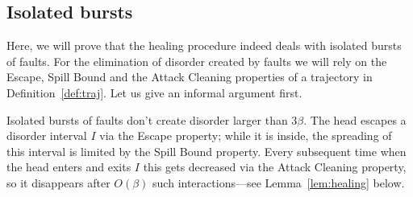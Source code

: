 \documentclass[11pt]{memoir}
\theoremstyle{definition} %
\def\B{B}
\newcommand{\Tu}{T}
\newcommand{\Z}{Z} %
\newcommand{\cns}[1]{c_{\textrm{\upshape #1}}}
\newcommand{\CEsc}{\cns{esc}}
\newcommand{\CMarg}{\cns{marg}}
\newcommand{\CSpill}{\cns{spill}}
\begin{document}

\subsection{Isolated bursts}\label{sec:1-level-noise}

Here, we will prove that the healing procedure indeed deals with isolated bursts of faults.
For the elimination of disorder created by faults
we will rely on the Escape, Spill Bound and the Attack Cleaning
properties of a trajectory in Definition~\ref{def:traj}.
Let us give an informal argument first.

Isolated bursts of faults don't create disorder larger than \( 3\beta \).
The head escapes a disorder interval \( I \) via the Escape property; while it is inside, the
spreading of this interval is limited by the Spill Bound property.
Every subsequent time when the head enters and exits \( I \) this gets decreased
via the Attack Cleaning property, so it disappears after \( O(\beta) \) such interactions---see
Lemma~\ref{lem:healing} below.

 
\end{document}
